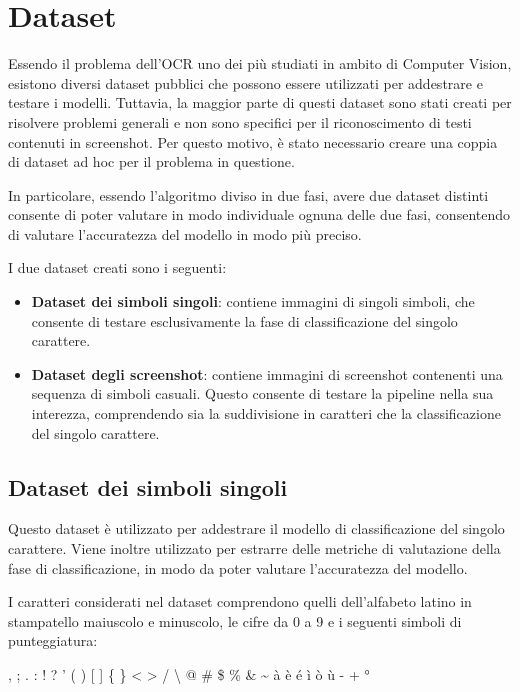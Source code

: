 \chapter{Dataset}

Essendo il problema dell'OCR uno dei più studiati in ambito di Computer Vision, esistono diversi dataset pubblici che possono essere utilizzati per addestrare e testare i modelli. Tuttavia, la maggior parte di questi dataset sono stati creati per risolvere problemi generali e non sono specifici per il riconoscimento di testi contenuti in screenshot. Per questo motivo, è stato necessario creare una coppia di dataset ad hoc per il problema in questione.

In particolare, essendo l'algoritmo diviso in due fasi, avere due dataset distinti consente di poter valutare in modo individuale ognuna delle due fasi, consentendo di valutare l'accuratezza del modello in modo più preciso.

I due dataset creati sono i seguenti:
\begin{itemize}
	\item \textbf{Dataset dei simboli singoli}: contiene immagini di singoli simboli, che consente di testare esclusivamente la fase di classificazione del singolo carattere.
	\item \textbf{Dataset degli screenshot}:  contiene immagini di screenshot contenenti una sequenza di simboli casuali. Questo consente di testare la pipeline nella sua interezza, comprendendo sia la suddivisione in caratteri che la classificazione del singolo carattere.
\end{itemize}

\section{Dataset dei simboli singoli}

Questo dataset è utilizzato per addestrare il modello di classificazione del singolo carattere. Viene inoltre utilizzato per estrarre delle metriche di valutazione della fase di classificazione, in modo da poter valutare l'accuratezza del modello.

I caratteri considerati nel dataset comprendono quelli dell'alfabeto latino in stampatello maiuscolo e minuscolo, le cifre da 0 a 9 e i seguenti simboli di punteggiatura:

\begin{center}
, ; . : ! ? ' ( ) [ ] \{ \} \textless{} \textgreater{} / \textbackslash{} @ \# \$ \texteuro{} \textsterling{} \% \& \textasciitilde{} à è é ì ò ù - + °
\end{center}

